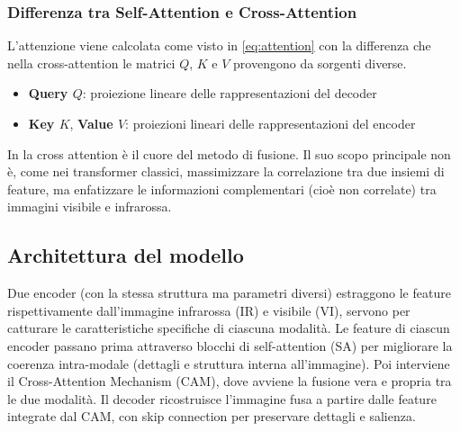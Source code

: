 \subsubsection{Differenza tra Self-Attention e  Cross-Attention}
L'attenzione viene calcolata come visto in \ref{eq:attention} con la differenza che nella cross-attention 
le matrici \(Q\), \(K\) e \(V\) provengono da sorgenti diverse. 
\begin{itemize}
  \item \textbf{Query \(Q\)}: proiezione lineare delle rappresentazioni del decoder
  \item \textbf{Key \(K\)}, \textbf{Value \(V\)}: proiezioni lineari delle rappresentazioni del encoder
\end{itemize}
In \cite{li2024crossfuse} la cross attention è il cuore del metodo di fusione. Il suo scopo principale non è, come nei transformer 
classici, massimizzare la correlazione tra due insiemi di feature, ma enfatizzare le informazioni complementari 
(cioè non correlate) tra immagini visibile e infrarossa.

\subsection{Architettura del modello}
Due encoder (con la stessa struttura ma parametri diversi) estraggono le feature rispettivamente dall’immagine infrarossa (IR) e visibile (VI), 
servono per catturare le caratteristiche specifiche di ciascuna modalità. Le feature di ciascun encoder passano prima attraverso blocchi di 
self-attention (SA) per migliorare la coerenza intra-modale (dettagli e struttura interna all’immagine).
Poi interviene il Cross-Attention Mechanism (CAM), dove avviene la fusione vera e propria tra le due modalità.
Il decoder ricostruisce l’immagine fusa a partire dalle feature integrate dal CAM, con skip connection per preservare dettagli e salienza.
